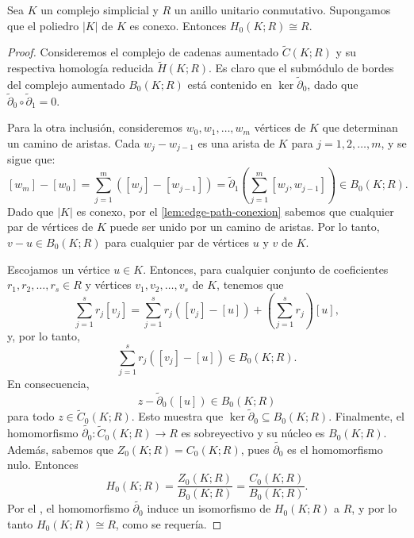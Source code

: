 \begin{teorema}
	\label{teo:comp-conex-iso-R}
	Sea \( K \) un complejo simplicial y \( R \) un anillo unitario conmutativo. Supongamos que el poliedro \( |K| \) de \( K \) es conexo. Entonces \( H_0(K; R) \cong R \).
\end{teorema}
\begin{proof}
	Consideremos el complejo de cadenas aumentado \( \widetilde{C}(K; R) \) y su respectiva homología reducida \( \widetilde{H}(K; R) \). Es claro que el submódulo de bordes del complejo aumentado \( B_0(K; R) \) está contenido en \( \ker \widetilde{\partial}_0 \), dado que \( \widetilde{\partial}_0 \circ \widetilde{\partial}_1 = 0 \).
	
	Para la otra inclusión, consideremos \( w_0, w_1, \ldots, w_m \) vértices de \( K \) que determinan un camino de aristas. Cada \( w_j - w_{j-1} \) es una arista de \( K \) para \( j = 1, 2, \ldots, m \), y se sigue que:
	\[
	[w_m] - [w_0] = \sum_{j=1}^m ([w_j] - [w_{j-1}]) = \widetilde{\partial}_1 \left( \sum_{j=1}^m [w_j, w_{j-1}] \right) \in B_0(K; R).
	\]
	Dado que \( |K| \) es conexo, por el \autoref{lem:edge-path-conexion} sabemos que cualquier par de vértices de \( K \) puede ser unido por un camino de aristas. Por lo tanto, \( v - u \in B_0(K; R) \) para cualquier par de vértices \( u \) y \( v \) de \( K \).
	
	Escojamos un vértice \( u \in K \). Entonces, para cualquier conjunto de coeficientes \( r_1, r_2, \ldots, r_s \in R \) y vértices \( v_1, v_2, \ldots, v_s \) de \( K \), tenemos que
	\[
	\sum_{j=1}^s r_j[v_j] = \sum_{j=1}^s r_j([v_j] - [u]) + \left( \sum_{j=1}^s r_j \right) [u],
	\]
	y, por lo tanto,
	\[
	\sum_{j=1}^s r_j([v_j] - [u]) \in B_0(K; R).
	\]
	En consecuencia,
	\[
	z - \widetilde{\partial}_0([u]) \in B_0(K; R)
	\]
	para todo \( z \in \widetilde{C}_0(K; R) \). Esto muestra que \( \ker \widetilde{\partial}_0 \subseteq B_0(K; R) \).
	Finalmente, el homomorfismo \( \widetilde{\partial_0} : \widetilde{C}_0(K; R) \rightarrow R \) es sobreyectivo y su núcleo es \( B_0(K; R) \). Además, sabemos que \(Z_0(K; R) = C_0(K; R)\), pues \( \widetilde{\partial_0} \) es el homomorfismo nulo. Entonces
	\[
	H_0(K; R) =\frac{ Z_0(K; R)}{B_0(K; R)} = \frac{C_0(K; R)}{B_0(K; R)}.
	\]
	Por el , el homomorfismo \( \widetilde{\partial_0} \) induce un isomorfismo de \( H_0(K; R) \) a \( R \), y por lo tanto \( H_0(K; R) \cong R \), como se requería.
\end{proof}


